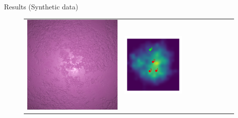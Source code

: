 \documentclass[final]{beamer}
\newlength{\twocolwid}
\newlength{\resultwidth}
\begin{document}
\begin{frame}[t]
\begin{columns}[t]
\begin{column}{\twocolwid}
\begin{block}{Results (Synthetic data)}
\begin{figure}[t]
\begin{tabular}{ccrclcccc}
            		\includegraphics[width=\resultwidth]{images/synth/plaster/optim.jpg} &
            		\includegraphics[width=\resultwidth]{images/synth/plaster/posterior.pdf} &

\end{tabular}
\end{figure}
\end{block}
\end{column}
\end{columns}
\end{frame}
\end{document}
